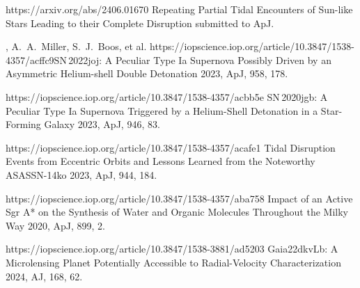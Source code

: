 


\begin{cvpubs}


\cvpub
{ %
\begin{cvitems}
    \item {}
    {}
    {https://arxiv.org/abs/2406.01670}
    {Repeating Partial Tidal Encounters of Sun-like Stars Leading to their Complete Disruption}
    {submitted to ApJ.}
    \item \cvsubpub
    {\Cliu, A.~A.~Miller, S.~J.~Boos, et al.}
    {}
    {https://iopscience.iop.org/article/10.3847/1538-4357/acffc9}{SN\,2022joj: A Peculiar Type Ia Supernova Possibly Driven by an Asymmetric Helium-shell Double Detonation}
    {2023, ApJ, 958, 178.}
    \item {}
    {}
    {https://iopscience.iop.org/article/10.3847/1538-4357/acbb5e}
    {SN\,2020jgb: A Peculiar Type Ia Supernova Triggered by a Helium-Shell Detonation in a Star-Forming Galaxy}
    {2023, ApJ, 946, 83.}
    \item {}
    {}
    {https://iopscience.iop.org/article/10.3847/1538-4357/acafe1}
    {Tidal Disruption Events from Eccentric Orbits and Lessons Learned from the Noteworthy ASASSN-14ko}
    {2023, ApJ, 944, 184.}
    \item {}
    {}
    {https://iopscience.iop.org/article/10.3847/1538-4357/aba758}
    {Impact of an Active Sgr A* on the Synthesis of Water and Organic Molecules Throughout the Milky Way}
    {2020, ApJ, 899, 2.}
    \item {} 
    {\Cliu}
    {https://iopscience.iop.org/article/10.3847/1538-3881/ad5203}
    {Gaia22dkvLb: A Microlensing Planet Potentially Accessible to Radial-Velocity Characterization}
    {2024, AJ, 168, 62.}

\end{cvitems}}
\end{cvpubs}
